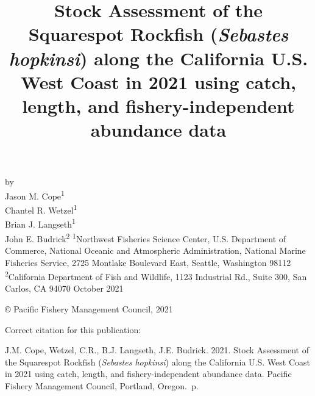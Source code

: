\documentclass[11pt,
  english,
  a4paper,
]{article}
\date{}
\newcommand{\trTitle}{Stock Assessment of the Squarespot Rockfish (\emph{Sebastes hopkinsi}) along the California U.S. West Coast in 2021 using catch, length, and fishery-independent abundance data}
\newcommand{\trYear}{2021}
\newcommand{\trMonth}{October}
\newcommand{\trAuthsBack}{J.M. Cope, Wetzel, C.R., B.J. Langseth, J.E. Budrick}
\newcommand{\trCitation}{
\begin{hangparas}{1em}{1}
\trAuthsBack{}. \trYear{}. \trTitle{}. Pacific Fishery Management Council, Portland, Oregon. \pageref{LastPage}{}\,p.
\end{hangparas}}
\begin{document}

\renewcommand*{\thefootnote}{\fnsymbol{footnote}}

\small
\thispagestyle{empty}
\noindent
\begin{center}
\title{Stock Assessment of the Squarespot Rockfish (\emph{Sebastes hopkinsi}) along the California U.S. West Coast in 2021 using catch, length, and fishery-independent abundance data}
\vspace{1.5cm}
{\Large\textbf{}}
\vfill
by\\
Jason M. Cope\textsuperscript{1}\\
Chantel R. Wetzel\textsuperscript{1}\\
Brian J. Langseth\textsuperscript{1}\\
John E. Budrick\textsuperscript{2}\vfill
\textsuperscript{1}Northwest Fisheries Science Center, U.S. Department of Commerce, National Oceanic and Atmospheric Administration, National Marine Fisheries Service, 2725 Montlake Boulevard East, Seattle, Washington 98112\\
\textsuperscript{2}California Department of Fish and Wildlife, 1123 Industrial Rd., Suite 300, San Carlos, CA 94070\vfill
\trMonth{} \trYear{}
\end{center}
\clearpage

\thispagestyle{empty}
\vspace*{\fill}
\begin{center}
\copyright{} Pacific Fishery Management Council, \trYear{}\\
\end{center}
\par
\bigskip
\noindent
Correct citation for this publication:
\bigskip
\par
\trCitation{}
\clearpage


\tableofcontents\clearpage
\label{TRlastRoman}
\clearpage

\newpage
\thispagestyle{empty} %

\pagestyle{plain}  %
\renewcommand*{\thefootnote}{\arabic{footnote}}  %
\setcounter{footnote}{0}  %
\renewcommand{\headrulewidth}{0.5pt}
\renewcommand{\footrulewidth}{0.5pt}
\end{document}

